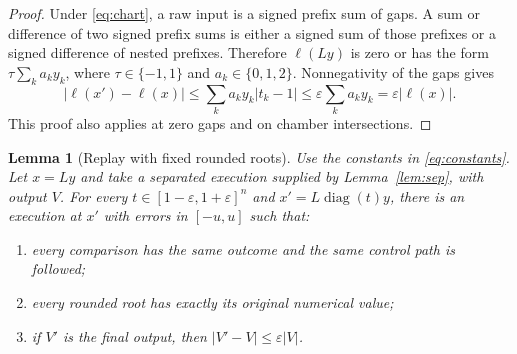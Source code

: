 \documentclass[11pt,a4paper]{article}
\newtheorem{lemma}[theorem]{Lemma}
\theoremstyle{definition}
\theoremstyle{remark}
\newcommand{\abs}[1]{\lvert #1\rvert}
\newcommand{\diag}{\operatorname{diag}}
\begin{document}
\begin{proof}
Under \eqref{eq:chart}, a raw input is a signed prefix sum of gaps. A sum or
difference of two signed prefix sums is either a signed sum of those prefixes
or a signed difference of nested prefixes. Therefore $\ell(Ly)$ is zero or
has the form $\tau\sum_k a_ky_k$, where $\tau\in\{-1,1\}$ and
$a_k\in\{0,1,2\}$. Nonnegativity of the gaps gives
\[
 \abs{\ell(x')-\ell(x)}
 \le\sum_k a_ky_k\abs{t_k-1}
 \le\varepsilon\sum_k a_ky_k
 =\varepsilon\abs{\ell(x)}.
\]
This proof also applies at zero gaps and on chamber intersections.
\end{proof}

\begin{lemma}[Replay with fixed rounded roots]\label{lem:replay}
Use the constants in \eqref{eq:constants}. Let $x=Ly$ and take a separated
execution supplied by Lemma~\ref{lem:sep}, with output $V$. For every
$t\in[1-\varepsilon,1+\varepsilon]^n$ and
$x'=L\diag(t)y$, there is an execution at $x'$ with errors in $[-u,u]$ such that:
\begin{enumerate}[label=\textnormal{(\alph*)}]
\item every comparison has the same outcome and the same control path is followed;
\item every rounded root has exactly its original numerical value;
\item if $V'$ is the final output, then $\abs{V'-V}\le\varepsilon\abs V$.
\end{enumerate}
\end{lemma}
\end{document}
